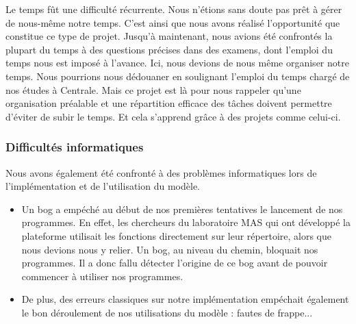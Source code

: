 Le temps fût une difficulté récurrente. Nous n'étions sans doute pas prêt à gérer de nous-même notre temps. C'est ainsi que nous avons réalisé l'opportunité que constitue ce type de projet. 
Jusqu'à maintenant, nous avions été confrontés la plupart du temps à des questions précises dans des examens, dont l'emploi du temps nous est imposé à l'avance. 
Ici, nous devions de nous même organiser notre temps. 
Nous pourrions nous dédouaner en soulignant l'emploi du temps chargé de nos études à Centrale. 
Mais ce projet est là pour nous rappeler qu'une organisation préalable et une répartition efficace des tâches doivent permettre d'éviter de subir le temps. Et cela s'apprend grâce à des projets comme celui-ci.

\subsubsection{Difficultés informatiques}

Nous avons également été confronté à des problèmes informatiques lors de l'implémentation et de l'utilisation du modèle.
\begin{itemize}
	\item Un bog a empéché au début de nos premières tentatives le lancement de nos programmes. En effet, les chercheurs
du laboratoire MAS qui ont développé la plateforme utilisait les fonctions directement sur leur répertoire, alors que nous devions nous y relier. Un bog, au niveau du chemin, bloquait nos programmes. Il a donc fallu détecter l'origine de ce bog avant de pouvoir commencer à utiliser nos programmes. 
	
	\item De plus, des erreurs classiques sur notre implémentation empéchait également le bon déroulement de nos utilisations du modèle : fautes de frappe...

\end{itemize}

